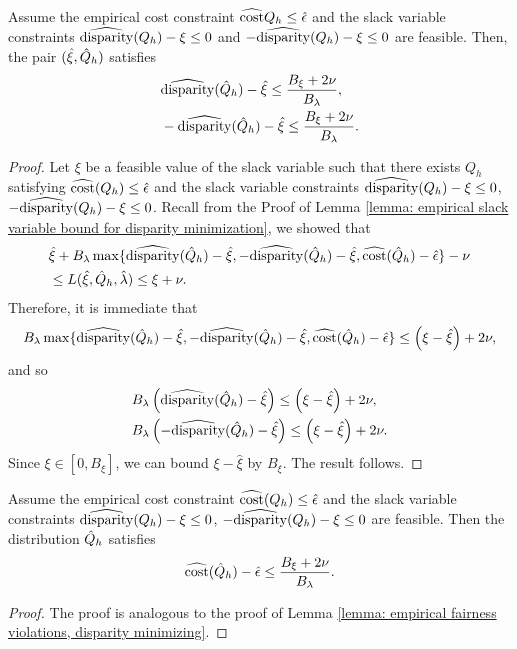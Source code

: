 \documentclass{article}
\begin{document}
\begin{lemma}\label{lemma: empirical fairness violations, disparity minimizing} 
    Assume the empirical cost constraint $\widehat{\operatorname{cost}}{Q_h} \leq \hat \epsilon$ and the slack variable constraints $\widehat{\operatorname{disparity}}(Q_h) - \xi \leq 0$ and $-\widehat{\operatorname{disparity}}(Q_h) - \xi \leq 0$ are feasible. Then, the pair $(\hat \xi, \hat{Q}_h)$ satisfies
        \begin{align*}
            & \widehat{\operatorname{disparity}}(\hat{Q}_h) - \hat \xi \leq \frac{B_\xi + 2 \nu}{B_\lambda}, \\
            & -\widehat{\operatorname{disparity}}(\hat{Q}_h) - \hat \xi \leq \frac{B_\xi + 2 \nu}{B_\lambda}.
        \end{align*}

    \begin{proof}
        Let $\xi$ be a feasible value of the slack variable such that there exists $Q_h$ satisfying $\widehat{\operatorname{cost}}(Q_h) \leq \hat{\epsilon}$ and the slack variable constraints $\widehat{\operatorname{disparity}}(Q_h) - \xi \leq 0$, $-\widehat{\operatorname{disparity}}(Q_h) - \xi \leq 0$. Recall from the Proof of Lemma \ref{lemma: empirical slack variable bound for disparity minimization}, we showed that 
            \begin{align*}
                & \hat{\xi} + B_{\lambda} \max\{ \widehat{\operatorname{disparity}}(\hat{Q}_h) - \hat{\xi}, -\widehat{\operatorname{disparity}}(\hat{Q}_h) -\hat{\xi}, \widehat{\operatorname{cost}}(\hat{Q}_h) - \hat{\epsilon}\} - \nu \\
                &\leq L(\hat \xi, \hat{Q}_h, \hat \lambda) \leq \xi + \nu.
            \end{align*}
        Therefore, it is immediate that
            \[
                 B_{\lambda} \max\{ \widehat{\operatorname{disparity}}(\hat{Q}_h) - \hat{\xi}, -\widehat{\operatorname{disparity}}(\hat{Q}_h) -\hat{\xi}, \widehat{\operatorname{cost}}(\hat{Q}_h) - \hat{\epsilon}\} \leq \left( \xi - \hat \xi \right) + 2 \nu,
            \]
         and so
            \begin{align*}
               & B_{\lambda} \left( \widehat{\operatorname{disparity}}(\hat{Q}_h) - \hat{\xi} \right) \leq \left( \xi - \hat \xi \right) + 2 \nu, \\
               & B_{\lambda} \left( -\widehat{\operatorname{disparity}}(\hat{Q}_h) -\hat{\xi} \right) \leq  \left( \xi - \hat \xi \right) + 2 \nu.
            \end{align*}
        Since $\xi \in [0, B_\xi]$, we can bound $\xi - \hat \xi$ by $B_\xi$. The result follows.
    \end{proof}
\end{lemma}

\begin{lemma}\label{lemma: empirical cost violation, disparity minimizing}
    Assume the empirical cost constraint $\widehat{\operatorname{cost}}(Q_h) \leq \hat{\epsilon}$ and the slack variable constraints $\widehat{\operatorname{disparity}}(Q_h) - \xi \leq 0$, $-\widehat{\operatorname{disparity}}(Q_h) - \xi \leq 0$ are feasible. Then the distribution $\hat{Q}_h$ satisfies 
        \[
            \widehat{\operatorname{cost}}(\hat{Q}_h) - \hat{\epsilon} \leq \frac{ B_\xi + 2 \nu }{ B_\lambda }.
        \]
    \begin{proof}
         The proof is analogous to the proof of Lemma \ref{lemma: empirical fairness violations, disparity minimizing}.
    \end{proof}
\end{lemma}
\end{document}
